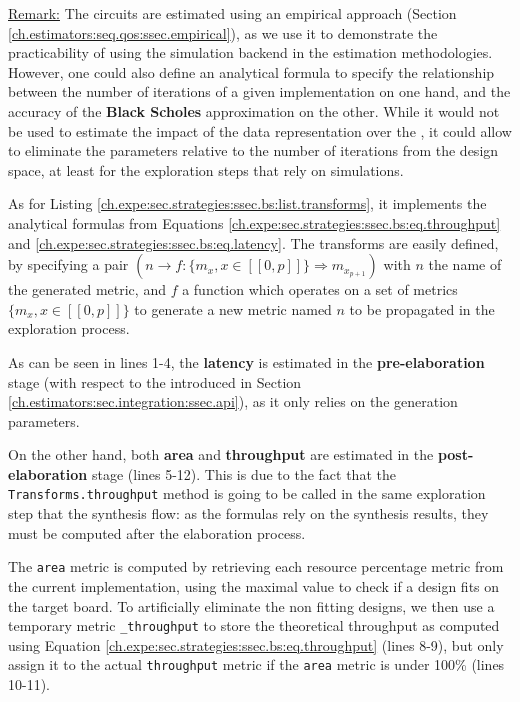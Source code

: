                 \underline{Remark:} The circuits  are estimated using an empirical approach (Section \ref{ch.estimators:seq.qos:ssec.empirical}), as we use it to demonstrate the practicability of using the simulation backend in the estimation methodologies.
                However, one could also define an analytical formula to specify the relationship between the number of iterations of a given implementation on one hand, and the accuracy of the {\bf Black Scholes} approximation on the other.
                 While it would not be used to estimate the impact of the data representation over the , it could allow to eliminate the parameters relative to the number of iterations from the design space, at least for the exploration steps that rely on simulations.

                As for Listing \ref{ch.expe:sec.strategies:ssec.bs:list.transforms}, it implements the analytical formulas from Equations \ref{ch.expe:sec.strategies:ssec.bs:eq.throughput} and \ref{ch.expe:sec.strategies:ssec.bs:eq.latency}.
                The transforms are easily defined, by specifying a pair $(n \rightarrow f: \{m_x, x \in [\![0, p]\!]\} \Rightarrow m_{x_{p+1}})$ with $n$ the name of the generated metric, and $f$ a function which operates on a set of metrics $\{m_x, x \in [\![0, p]\!]\}$ to generate a new metric named $n$ to be propagated in the exploration process.

                As can be seen in lines 1-4, the {\bf latency} is estimated in the {\bf pre-elaboration} stage (with respect to the  introduced in Section \ref{ch.estimators:sec.integration:ssec.api}), as it only relies on the generation parameters.

                On the other hand, both {\bf area} and {\bf throughput} are estimated in the {\bf post-elaboration} stage (lines 5-12).
                This is due to the fact that the \lstinline{Transforms.throughput} method is going to be called in the same exploration step that the synthesis flow:  as the formulas rely on the synthesis results, they must be computed after the elaboration process.

\clearpage
                The \lstinline{area} metric is computed by retrieving each resource percentage metric from the current implementation, using the maximal value to check if a design fits on the target board.
                To artificially eliminate the non fitting designs, we then use a temporary metric \lstinline{_throughput} to store the theoretical throughput as computed using Equation \ref{ch.expe:sec.strategies:ssec.bs:eq.throughput} (lines 8-9), but only assign it to the actual \lstinline{throughput} metric if the \lstinline{area} metric is under 100\% (lines 10-11).

